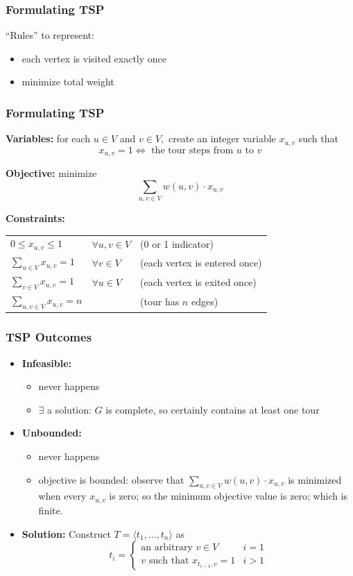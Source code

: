 \documentclass[10pt,aspectratio=169]{beamer}
\begin{document}
  \begin{frame} \frametitle{Formulating TSP}
    ``Rules'' to represent:
      \begin{itemize}
        \item each vertex is visited exactly once
        \item minimize total weight
      \end{itemize}
  \end{frame}
  
  \begin{frame} \frametitle{Formulating TSP}
  \textbf{Variables:} for each $u \in V$ and $v \in V,$ create an integer variable $x_{u, v}$ such that
  \[ x_{u,v} = 1 \Leftrightarrow \text{ the tour steps from } u \text{ to } v \]
  
  \textbf{Objective:} minimize
  \[ \sum_{u, v \in V} w(u, v) \cdot x_{u, v} \]
  
  \textbf{Constraints:}
  \begin{tabular}{lll}
    $0 \leq x_{u, v} \leq 1$ & $\forall u, v \in V$ & (0 or 1 indicator) \\
    $\sum_{u \in V} x_{u, v} = 1 $ & $\forall v \in V$ & (each vertex is entered once) \\
    $\sum_{v \in V} x_{u, v} = 1 $ & $\forall u \in V$ & (each vertex is exited once) \\
    $\sum_{u, v \in V} x_{u, v} = n$ & & (tour has $n$ edges) 
  \end{tabular}
  
  \end{frame}
  
  \begin{frame} \frametitle{TSP Outcomes}
    \begin{itemize}
      \item \textbf{Infeasible:}
        \begin{itemize}
        \item never happens
        \item $\exists$ a solution: $G$ is complete, so certainly contains at least one tour
        \end{itemize}
      \item \textbf{Unbounded:}
      \begin{itemize}
        \item never happens
        \item objective is bounded: observe that $\sum_{u, v \in V} w(u, v) \cdot x_{u, v}$
          is minimized when every $x_{u,v}$ is zero; so the minimum objective value is zero; which is finite.
      \end{itemize}
      \item \textbf{Solution:} Construct $T=\langle t_1, \ldots, t_n \rangle$ as
       \[
        t_i =
        \begin{cases}
          \text{an arbitrary } v \in V & i=1 \\
          v \text{ such that } x_{t_{i-1}, v}=1 & i>1 
        \end{cases}
       \]
      \end{itemize}
    \end{frame}
  
\end{document}
